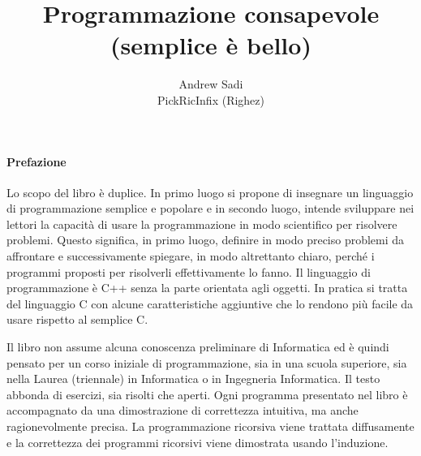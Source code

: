 \documentclass[a4paper,12pt]{book}
\begin{document}
\author{Andrew Sadi \\ PickRicInfix (Righez)}
\title{Programmazione consapevole \\ (semplice è bello)}
\maketitle

\tableofcontents

\newpage

\paragraph{Prefazione}
Lo scopo del libro è duplice.
In primo luogo si propone di insegnare un linguaggio di programmazione semplice e popolare e in secondo luogo, intende sviluppare nei lettori la capacità di usare la programmazione in modo scientifico per risolvere problemi.
Questo significa, in primo luogo, definire in modo preciso  problemi da affrontare e successivamente spiegare, in modo altrettanto chiaro, perché i programmi proposti per risolverli effettivamente lo fanno.
Il linguaggio di programmazione è C++ senza la parte orientata agli oggetti.
In pratica si tratta del linguaggio C con alcune caratteristiche aggiuntive che lo rendono più facile da usare rispetto al semplice C.

Il libro non assume alcuna conoscenza preliminare di Informatica ed è quindi pensato per un corso iniziale di programmazione, sia in una scuola superiore, sia nella Laurea (triennale) in Informatica o in Ingegneria Informatica.
Il testo abbonda di esercizi, sia risolti che aperti. Ogni programma presentato nel libro è accompagnato da una dimostrazione di correttezza intuitiva, ma anche ragionevolmente precisa.
La programmazione ricorsiva viene trattata diffusamente e la correttezza dei programmi ricorsivi viene dimostrata usando l'induzione.

























\end{document}
